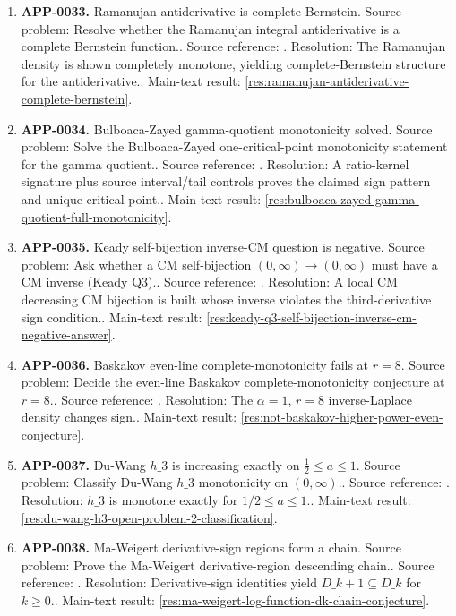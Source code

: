 \begin{enumerate}[leftmargin=*]
\item \textbf{APP-0033.} Ramanujan antiderivative is complete Bernstein.  Source problem: Resolve whether the Ramanujan integral antiderivative is a complete Bernstein function.. Source reference: \cite{app-app-0033-source}. Resolution: The Ramanujan density is shown completely monotone, yielding complete-Bernstein structure for the antiderivative.. Main-text result: \ref{res:ramanujan-antiderivative-complete-bernstein}.
\item \textbf{APP-0034.} Bulboaca-Zayed gamma-quotient monotonicity solved.  Source problem: Solve the Bulboaca-Zayed one-critical-point monotonicity statement for the gamma quotient.. Source reference: \cite{app-app-0034-source}. Resolution: A ratio-kernel signature plus source interval/tail controls proves the claimed sign pattern and unique critical point.. Main-text result: \ref{res:bulboaca-zayed-gamma-quotient-full-monotonicity}.
\item \textbf{APP-0035.} Keady self-bijection inverse-CM question is negative.  Source problem: Ask whether a CM self-bijection \((0,\infty)\to(0,\infty)\) must have a CM inverse (Keady Q3).. Source reference: \cite{app-app-0035-source}. Resolution: A local CM decreasing CM bijection is built whose inverse violates the third-derivative sign condition.. Main-text result: \ref{res:keady-q3-self-bijection-inverse-cm-negative-answer}.
\item \textbf{APP-0036.} Baskakov even-line complete-monotonicity fails at \(r=8\).  Source problem: Decide the even-line Baskakov complete-monotonicity conjecture at \(r=8\).. Source reference: \cite{app-app-0036-source}. Resolution: The \(\alpha=1\), \(r=8\) inverse-Laplace density changes sign.. Main-text result: \ref{res:not-baskakov-higher-power-even-conjecture}.
\item \textbf{APP-0037.} Du-Wang \(h\_3\) is increasing exactly on \(\frac12\le a\le1\).  Source problem: Classify Du-Wang \(h\_3\) monotonicity on \((0,\infty)\).. Source reference: \cite{app-app-0037-source}. Resolution: \(h\_3\) is monotone exactly for \(1/2\le a\le1\).. Main-text result: \ref{res:du-wang-h3-open-problem-2-classification}.
\item \textbf{APP-0038.} Ma-Weigert derivative-sign regions form a chain.  Source problem: Prove the Ma-Weigert derivative-region descending chain.. Source reference: \cite{app-app-0038-source}. Resolution: Derivative-sign identities yield \(D\_{k+1}\subseteq D\_k\) for \(k\ge0\).. Main-text result: \ref{res:ma-weigert-log-function-dk-chain-conjecture}.

\end{enumerate}
